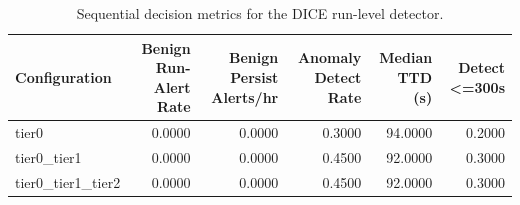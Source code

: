 \begin{table}[t]
\centering
\caption{Sequential decision metrics for the DICE run-level detector.}
\label{tab:dice_sequential_metrics}
\footnotesize
\begin{tabular}{lrrrrr}
\toprule
Configuration & Benign Run-Alert Rate & Benign Persist Alerts/hr & Anomaly Detect Rate & Median TTD (s) & Detect <=300s \\
\midrule
tier0 & 0.0000 & 0.0000 & 0.3000 & 94.0000 & 0.2000 \\
tier0_tier1 & 0.0000 & 0.0000 & 0.4500 & 92.0000 & 0.3000 \\
tier0_tier1_tier2 & 0.0000 & 0.0000 & 0.4500 & 92.0000 & 0.3000 \\
\bottomrule
\end{tabular}

\end{table}
